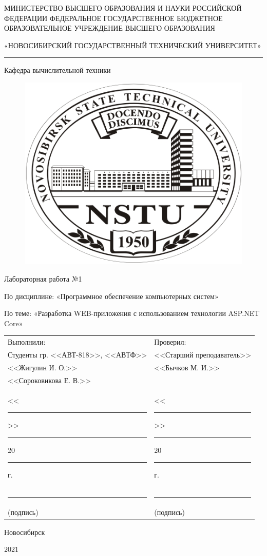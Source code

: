 \thispagestyle{empty}
\begin{center}

МИНИСТЕРСТВО ВЫСШЕГО ОБРАЗОВАНИЯ И НАУКИ РОССИЙСКОЙ ФЕДЕРАЦИИ
ФЕДЕРАЛЬНОЕ ГОСУДАРСТВЕННОЕ БЮДЖЕТНОЕ
ОБРАЗОВАТЕЛЬНОЕ УЧРЕЖДЕНИЕ
ВЫСШЕГО ОБРАЗОВАНИЯ

«НОВОСИБИРСКИЙ ГОСУДАРСТВЕННЫЙ ТЕХНИЧЕСКИЙ УНИВЕРСИТЕТ»

\noindent\rule{\textwidth}{0.4pt}

Кафедра вычислительной техники

\begin{figure}[H]
	\centering
	\includegraphics{title/logo.jpeg}
\end{figure}

Лабораторная работа №1

По дисциплине: «Программное обеспечение компьютерных систем»

По теме: «Разработка WEB-приложения с использованием технологии ASP.NET Core»

\end{center}

\noindent\begin{tabular}{p{}p{}}
	Выполнили:                                                        & Проверил: \\
	Студенты гр. <<АВТ-818>>, <<АВТФ>>                                & <<Старший преподаватель>>\\
	<<Жигулин И. О.>>                                                 & <<Бычков М. И.>> \\
	<<Сороковикова Е. В.>>                                            & \\
	<<\rule{1.5em}{0.4pt}>> \rule{5em}{0.4pt} 20\rule{1.5em}{0.4pt}г. & <<\rule{1.5em}{0.4pt}>> \rule{5em}{0.4pt} 20\rule{1.5em}{0.4pt}г.\\
	\rule{7.5em}{0.4pt}                                               & \rule{7.5em}{0.4pt} \\
	\hspace{1.5em}(подпись)                                           & \hspace{1.5em}(подпись)
\end{tabular}


\begin{center}

\vspace{2.0cm}

Новосибирск

2021
\end{center}
